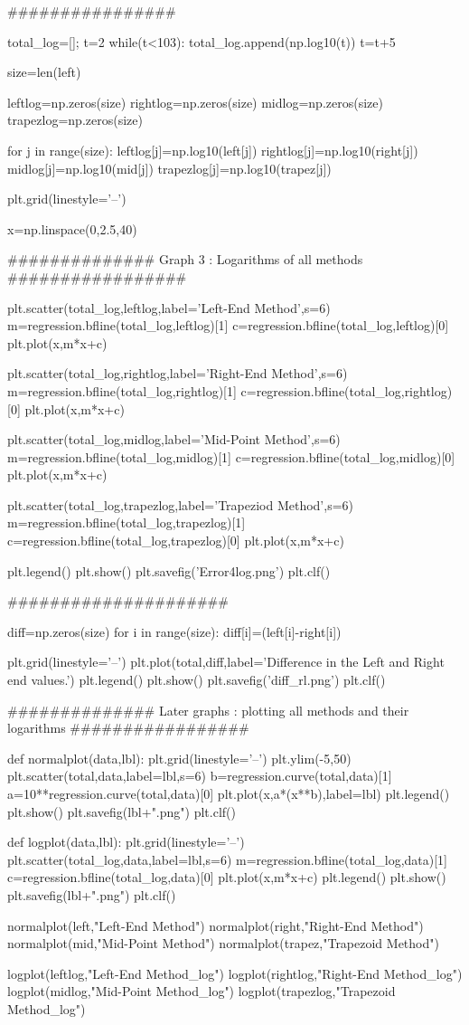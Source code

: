 \documentclass[12pt]{article}
\begin{document}
\begin{python}
################

total_log=[]; t=2
while(t<103):
    total_log.append(np.log10(t))
    t=t+5

size=len(left)

leftlog=np.zeros(size)
rightlog=np.zeros(size)
midlog=np.zeros(size)
trapezlog=np.zeros(size)

for j in range(size):
    leftlog[j]=np.log10(left[j])
    rightlog[j]=np.log10(right[j])
    midlog[j]=np.log10(mid[j])
    trapezlog[j]=np.log10(trapez[j])



plt.grid(linestyle='--')

x=np.linspace(0,2.5,40)

##############  Graph 3 : Logarithms of all methods #################

plt.scatter(total_log,leftlog,label='Left-End Method',s=6)
m=regression.bfline(total_log,leftlog)[1]
c=regression.bfline(total_log,leftlog)[0]
plt.plot(x,m*x+c)

plt.scatter(total_log,rightlog,label='Right-End Method',s=6)
m=regression.bfline(total_log,rightlog)[1]
c=regression.bfline(total_log,rightlog)[0]
plt.plot(x,m*x+c)

plt.scatter(total_log,midlog,label='Mid-Point Method',s=6)
m=regression.bfline(total_log,midlog)[1]
c=regression.bfline(total_log,midlog)[0]
plt.plot(x,m*x+c)

plt.scatter(total_log,trapezlog,label='Trapeziod Method',s=6)
m=regression.bfline(total_log,trapezlog)[1]
c=regression.bfline(total_log,trapezlog)[0]
plt.plot(x,m*x+c)

plt.legend()
plt.show()
plt.savefig('Error4log.png')
plt.clf()


#####################

diff=np.zeros(size)
for i in range(size):
    diff[i]=(left[i]-right[i])

plt.grid(linestyle='--')
plt.plot(total,diff,label='Difference in the Left and Right end values.')
plt.legend()
plt.show()
plt.savefig('diff_rl.png')
plt.clf()

##############  Later graphs : plotting all methods  and their logarithms #################

def normalplot(data,lbl):
    plt.grid(linestyle='--')
    plt.ylim(-5,50)
    plt.scatter(total,data,label=lbl,s=6)
    b=regression.curve(total,data)[1]
    a=10**regression.curve(total,data)[0]
    plt.plot(x,a*(x**b),label=lbl)
    plt.legend()
    plt.show()
    plt.savefig(lbl+".png")
    plt.clf()


def logplot(data,lbl):
    plt.grid(linestyle='--')
    plt.scatter(total_log,data,label=lbl,s=6)
    m=regression.bfline(total_log,data)[1]
    c=regression.bfline(total_log,data)[0]
    plt.plot(x,m*x+c)
    plt.legend()
    plt.show()
    plt.savefig(lbl+".png")
    plt.clf()


normalplot(left,"Left-End Method")
normalplot(right,"Right-End Method")
normalplot(mid,"Mid-Point Method")
normalplot(trapez,"Trapezoid Method")

logplot(leftlog,"Left-End Method_log")
logplot(rightlog,"Right-End Method_log")
logplot(midlog,"Mid-Point Method_log")
logplot(trapezlog,"Trapezoid  Method_log")
\end{python}
\end{document}
